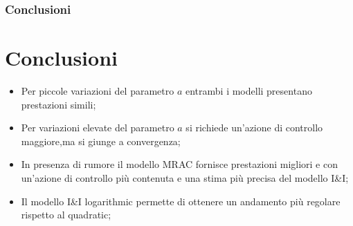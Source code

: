 \documentclass{beamer}
\begin{document}
\begin{frame}
	\frametitle{Conclusioni}
	\section{Conclusioni}
	\begin{itemize}
		\item Per piccole variazioni del parametro \(a\) entrambi i modelli presentano prestazioni simili;
  \item Per variazioni elevate del parametro \(a\) si richiede un'azione di controllo maggiore,ma si giunge a convergenza;
  \item In presenza di rumore il modello MRAC fornisce prestazioni migliori e con un'azione di controllo più contenuta e una stima più precisa del modello I\&I\@;
\item Il modello I\&I logarithmic permette di ottenere un andamento più regolare rispetto al quadratic;
	\end{itemize}
\end{frame}
\end{document}

